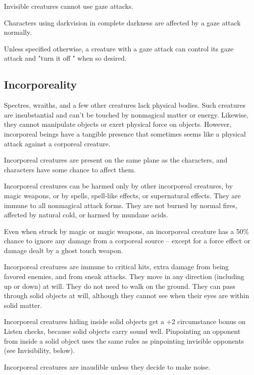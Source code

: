 Invisible creatures cannot use gaze attacks.

Characters using darkvision in complete darkness are affected by a gaze attack 
normally.

Unless specified otherwise, a creature with a gaze attack can control its gaze 
attack and "turn it off " when so desired.

\subsection{Incorporeality}

Spectres, wraiths, and a few other creatures lack physical bodies. Such creatures 
are insubstantial and can't be touched by nonmagical matter or energy. Likewise, 
they cannot manipulate objects or exert physical force on objects. However, incorporeal 
beings have a tangible presence that sometimes seems like a physical attack against 
a corporeal creature. 

Incorporeal creatures are present on the same plane as the characters, and characters 
have some chance to affect them. 

Incorporeal creatures can be harmed only by other incorporeal creatures, by magic 
weapons, or by spells, spell-like effects, or supernatural effects. They are immune 
to all nonmagical attack forms. They are not burned by normal fires, affected by 
natural cold, or harmed by mundane acids.

Even when struck by magic or magic weapons, an incorporeal creature has a 50\% 
chance to ignore any damage from a corporeal source -- except for a force effect
or damage dealt by a ghost touch weapon.

Incorporeal creatures are immune to critical hits, extra damage from being favored 
enemies, and from sneak attacks. They move in any direction (including up or down) 
at will. They do not need to walk on the ground. They can pass through solid objects 
at will, although they cannot see when their eyes are within solid matter. 

Incorporeal creatures hiding inside solid objects get a +2 circumstance bonus on 
Listen checks, because solid objects carry sound well. Pinpointing an opponent 
from inside a solid object uses the same rules as pinpointing invisible opponents 
(see Invisibility, below). 

Incorporeal creatures are inaudible unless they decide to make noise.

